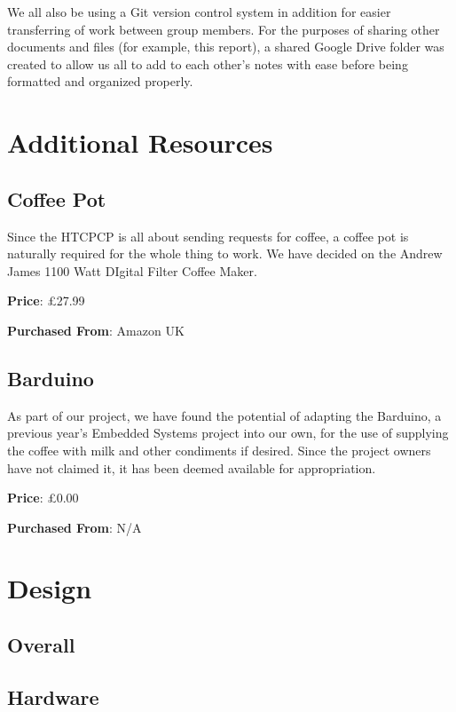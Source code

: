 \documentclass[12pt, a4paper]{article}
\begin{document}
We all also be using a Git version control system in addition for easier
transferring of work between group members. For the purposes of sharing other
documents and files (for example, this report), a shared Google Drive folder was
created to allow us all to add to each other's notes with ease before being
formatted and organized properly.

\section{Additional Resources}
\subsection{Coffee Pot}
Since the HTCPCP is all about sending requests for coffee, a coffee pot is
naturally required for the whole thing to work. We have decided on the Andrew
James 1100 Watt DIgital Filter Coffee Maker.

\textbf{Price}: £27.99

\textbf{Purchased From}: Amazon UK
\subsection{Barduino}
As part of our project, we have found the potential of adapting the Barduino, a
previous year’s Embedded Systems project into our own, for the use of supplying
the coffee with milk and other condiments if desired. Since the project owners
have not claimed it, it has been deemed available for appropriation.

\textbf{Price}: £0.00

\textbf{Purchased From}: N/A
\newpage


\section{Design}
\subsection{Overall}

\newpage

\subsection{Hardware}

\newpage
\end{document}
